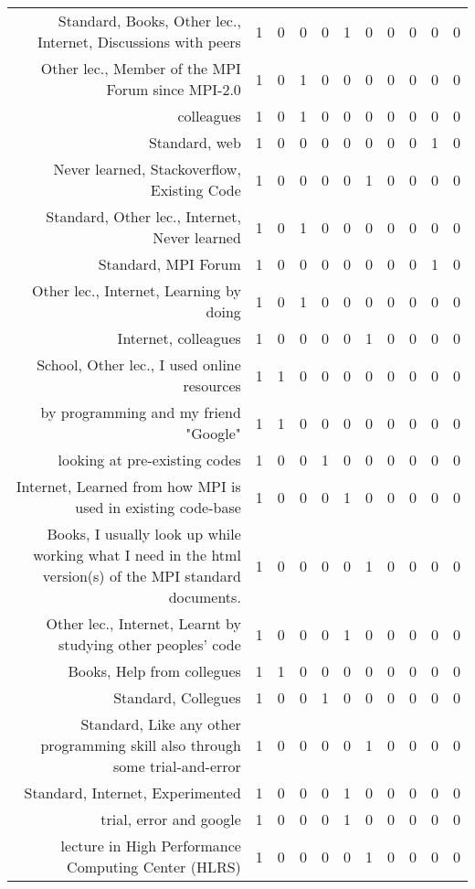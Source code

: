 {\begin{landscape}
\begin{longtable}[htb]{r|c|c|c|c|c|c|c|c|c|c}
{Standard, Books, Other lec., Internet, Discussions with peers} & 1 & 0 & 0 & 0 & 1 & 0 & 0 & 0 & 0 & 0 \\%
{Other lec., Member of the MPI Forum since MPI-2.0} & 1 & 0 & 1 & 0 & 0 & 0 & 0 & 0 & 0 & 0 \\%
{colleagues} & 1 & 0 & 1 & 0 & 0 & 0 & 0 & 0 & 0 & 0 \\%
{Standard, web} & 1 & 0 & 0 & 0 & 0 & 0 & 0 & 0 & 1 & 0 \\%
{Never learned, Stackoverflow, Existing Code} & 1 & 0 & 0 & 0 & 0 & 1 & 0 & 0 & 0 & 0 \\%
{Standard, Other lec., Internet, Never learned} & 1 & 0 & 1 & 0 & 0 & 0 & 0 & 0 & 0 & 0 \\%
{Standard, MPI Forum} & 1 & 0 & 0 & 0 & 0 & 0 & 0 & 0 & 1 & 0 \\%
{Other lec., Internet, Learning by doing} & 1 & 0 & 1 & 0 & 0 & 0 & 0 & 0 & 0 & 0 \\%
{Internet, colleagues} & 1 & 0 & 0 & 0 & 0 & 1 & 0 & 0 & 0 & 0 \\%
{School, Other lec., I used online resources} & 1 & 1 & 0 & 0 & 0 & 0 & 0 & 0 & 0 & 0 \\%
{by programming and my friend "Google"} & 1 & 1 & 0 & 0 & 0 & 0 & 0 & 0 & 0 & 0 \\%
{looking at pre-existing codes} & 1 & 0 & 0 & 1 & 0 & 0 & 0 & 0 & 0 & 0 \\%
{Internet, Learned from how MPI is used in existing code-base} & 1 & 0 & 0 & 0 & 1 & 0 & 0 & 0 & 0 & 0 \\%
{Books, I usually look up while working what I need in the html version(s) of the MPI standard documents.} & 1 & 0 & 0 & 0 & 0 & 1 & 0 & 0 & 0 & 0 \\%
{Other lec., Internet, Learnt by studying other peoples' code} & 1 & 0 & 0 & 0 & 1 & 0 & 0 & 0 & 0 & 0 \\%
{Books, Help from collegues} & 1 & 1 & 0 & 0 & 0 & 0 & 0 & 0 & 0 & 0 \\%
{Standard, Collegues} & 1 & 0 & 0 & 1 & 0 & 0 & 0 & 0 & 0 & 0 \\%
{Standard, Like any other programming skill also through some trial-and-error} & 1 & 0 & 0 & 0 & 0 & 1 & 0 & 0 & 0 & 0 \\%
{Standard, Internet, Experimented} & 1 & 0 & 0 & 0 & 1 & 0 & 0 & 0 & 0 & 0 \\%
{trial, error and google} & 1 & 0 & 0 & 0 & 1 & 0 & 0 & 0 & 0 & 0 \\%
{lecture in High Performance Computing Center (HLRS)} & 1 & 0 & 0 & 0 & 0 & 1 & 0 & 0 & 0 & 0 \\%

\end{longtable}
\end{landscape}}
